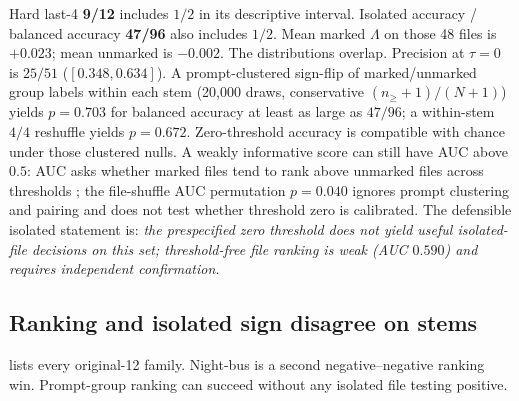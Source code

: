 \documentclass[11pt,a4paper]{article}
\theoremstyle{definition}
\newcommand{\LLR}{\Lambda}
\begin{document}
Hard last-4 \textbf{9/12} includes $1/2$ in its descriptive interval.
Isolated accuracy / balanced accuracy \textbf{47/96} also includes $1/2$. Mean
marked $\LLR$ on those 48 files is $+0.023$; mean unmarked is $-0.002$.
The distributions overlap. Precision at $\tau=0$ is $25/51$
($[0.348,0.634]$). A prompt-clustered sign-flip of marked/unmarked
group labels within each stem (20{,}000 draws, conservative
$(n_{\ge}+1)/(N+1)$) yields $p=0.703$ for balanced accuracy at least as
large as $47/96$; a within-stem $4/4$ reshuffle yields $p=0.672$.
Zero-threshold accuracy is compatible with chance under those clustered nulls. A weakly
informative score can still have AUC above $0.5$: AUC asks whether
marked files tend to rank above unmarked files across thresholds
\citep{fawcett2006roc}; the file-shuffle AUC permutation $p=0.040$
ignores prompt clustering and pairing and does
not test whether threshold zero is calibrated. The defensible isolated
statement is: \emph{the prespecified zero threshold does not yield
useful isolated-file decisions on this set; threshold-free file ranking
is weak (AUC $0.590$) and requires independent confirmation.}

\subsection{Ranking and isolated sign disagree on stems}
\label{sec:stems}

 lists every original-12 family. Night-bus is a second
negative--negative ranking win. Prompt-group ranking can succeed without
any isolated file testing positive.
\end{document}
